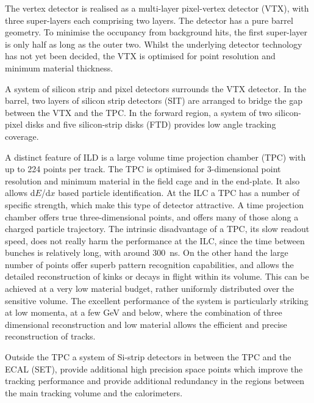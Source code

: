 The vertex detector is realised as a multi-layer pixel-vertex detector (VTX), with three super-layers each comprising two layers. The detector has a pure barrel geometry. To minimise the occupancy from background hits,
the first super-layer is only half as long as the outer two. Whilst the underlying detector technology has not yet been decided, 
the VTX is optimised for point resolution and minimum material thickness. 
	
A system of silicon strip and pixel detectors surrounds the VTX detector. In the barrel, two layers of silicon strip detectors (SIT) are arranged to bridge the gap between the VTX and the TPC. In the forward region, a system of two silicon-pixel disks and five silicon-strip disks (FTD) provides low angle tracking coverage.

A distinct feature of ILD is a large volume time projection chamber (TPC) with up to 224 points per track. The TPC is optimised for 3-dimensional point resolution and minimum material in the field cage and in the end-plate. It also allows d$E$/d$x$ based particle identification. At the ILC a TPC has a number of specific strength, which make this type of detector attractive. A time projection chamber offers true three-dimensional points, and offers many of those along a charged particle trajectory. The intrinsic disadvantage of a TPC, its slow readout speed, does not really harm the performance at the ILC, since the time between bunches is relatively long, with around 300~ns. On the other hand the large number of points offer superb pattern recognition capabilities, and allows the detailed reconstruction of kinks or decays in flight within its volume. This can be achieved at a very low material budget, rather uniformly distributed over the sensitive volume. The excellent performance of the system is particularly striking at low momenta, at a few GeV and below, where the combination of three dimensional reconstruction and low material allows the efficient and precise reconstruction of tracks. 

Outside the TPC a system of Si-strip detectors in between the TPC and the ECAL (SET), provide additional high precision space points which improve the tracking performance and provide additional
    redundancy in the regions between the main tracking volume and the calorimeters. 

